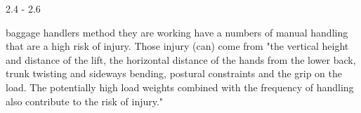 2.4 -  2.6















baggage handlers method they are working have a numbers of manual handling that are a high risk of injury. Those injury (can) come from "the vertical height and distance of the lift, the horizontal distance of the hands from the lower back, trunk twisting and sideways bending, postural constraints and the grip on the load. The potentially high load weights combined with the 
frequency of handling also contribute to the risk of injury."
